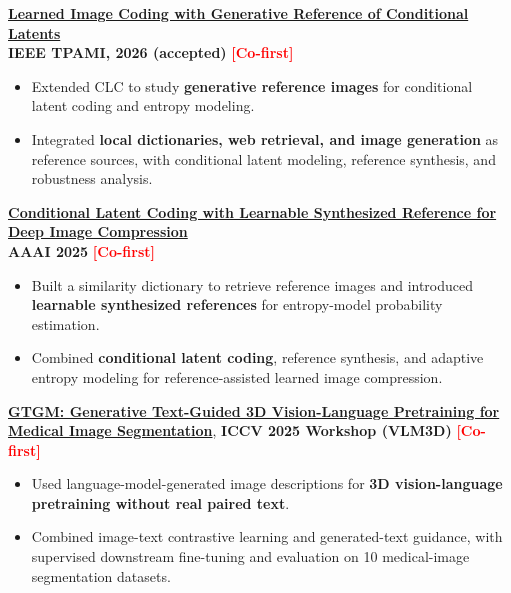 \documentclass{resume}
\begin{document}
\begin{enumerate}[label=\textbf{[\arabic*]}, leftmargin=2em, itemsep=3pt]
    \item \textbf{\href{https://doi.org/10.1109/TPAMI.2026.3744812}{Learned Image Coding with Generative Reference of Conditional Latents}} \\
    \textbf{IEEE TPAMI, 2026 (accepted)} \hfill \mbox{\textcolor{red}{\textbf{[Co-first]}}}
    \begin{itemize}
        \item Extended CLC to study \textbf{generative reference images} for conditional latent coding and entropy modeling.
        \item Integrated \textbf{local dictionaries, web retrieval, and image generation} as reference sources, with conditional latent modeling, reference synthesis, and robustness analysis.
    \end{itemize}

    \item \textbf{\href{https://doi.org/10.1609/aaai.v39i12.33403}{Conditional Latent Coding with Learnable Synthesized Reference for Deep Image Compression}} \\
    \textbf{AAAI 2025} \hfill \mbox{\textcolor{red}{\textbf{[Co-first]}}}
    \begin{itemize}
        \item Built a similarity dictionary to retrieve reference images and introduced \textbf{learnable synthesized references} for entropy-model probability estimation.
        \item Combined \textbf{conditional latent coding}, reference synthesis, and adaptive entropy modeling for reference-assisted learned image compression.
    \end{itemize}

    \item \textbf{\href{https://openaccess.thecvf.com/content/ICCV2025W/VLM3D/html/Chen_GTGM_Generative_Text-Guided_3D_Vision-Language_Pretraining_for_Medical_Image_Segmentation_ICCVW_2025_paper.html}{GTGM: Generative Text-Guided 3D Vision-Language Pretraining for Medical Image Segmentation}}, \textbf{ICCV 2025 Workshop (VLM3D)} \hfill \mbox{\textcolor{red}{\textbf{[Co-first]}}}
    \begin{itemize}
        \item Used language-model-generated image descriptions for \textbf{3D vision-language pretraining without real paired text}.
        \item Combined image-text contrastive learning and generated-text guidance, with supervised downstream fine-tuning and evaluation on 10 medical-image segmentation datasets.
    \end{itemize}


\end{enumerate}
\end{document}

